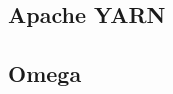 \subsection{Apache YARN \texorpdfstring{\cite{yarn}}{}}


\subsection{Omega \texorpdfstring{\cite{omega}}{}}
